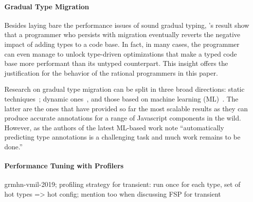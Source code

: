 \paragraph{Gradual Type Migration} Besides laying bare the performance
issues of sound gradual typing, \citet{gtnffvf-jfp-2019}'s result show
that a programmer who persists with migration eventually reverts the
negative impact of adding types to a code base. In fact, in many cases,
the programmer can even manage to unlock type-driven optimizations that
make a typed code base more performant than its untyped counterpart. This
insight offers the justification for the behavior of the rational
programmers in this paper. 

Research on gradual type migration can be split in three broad directions:
static techniques~\cite{rch:in-out-infer-gt, km:ts-type-evo,
mp:gt-decidable, ccew:gt-migrate, gc:gt-infer,
cagg-solver-based-migration,clps-popl-2020,js-infer,ruby-static-infer,unif-infer};
dynamic
ones~\cite{msi:gt-infer-hm,dyn-infer-ruby,profile-guided-typing,jstrace},
and those based on machine learning
(ML)~\cite{lambdanet,nl2ptype,learn-types-big-data,ml-ts}. The latter are
the ones that have provided so far the most scalable results as they can
produce accurate annotations for a range of Javascript components in the
wild. However, as the authors of the latest ML-based work note
``automatically predicting type annotations is a challenging task and much
work remains to be done.''
 
\paragraph{Performance Tuning with Profilers}

grmhn-vmil-2019;
profiling strategy for transient: run once for each type, set of hot types => hot config;
mention too when discussing FSP for transient






